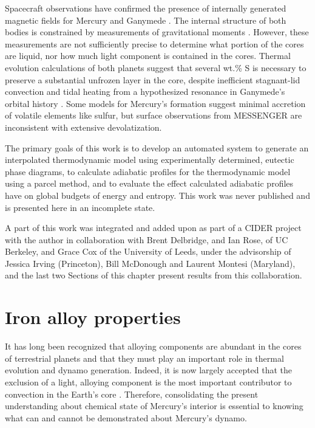 Spacecraft observations have confirmed the presence of internally generated
magnetic fields for Mercury \citep{Anderson2011} and Ganymede \cite{Kivelson1996}.
The internal structure of both bodies is constrained by measurements of
gravitational moments \citep{Smith2012,Hauck2006}. However, these measurements are
not sufficiently precise to determine what portion of the cores are liquid, nor
how much light component is contained in the cores. Thermal evolution
calculations of both planets \citep{Hauck2004,Hauck2006,Breuer2007,Bland2008} suggest
that several wt.\% S is necessary to preserve a substantial unfrozen layer in
the core, despite inefficient stagnant-lid convection
\citep{Solomatov2000,Hauck2004,Breuer2007} and tidal heating from a hypothesized
resonance in Ganymede's orbital history \citep{Showman1997,Bland2008}. Some models
for Mercury's formation suggest minimal accretion of volatile elements like
sulfur, but surface observations from MESSENGER \citep{Nittler2011,Mccubbin2012} are
inconsistent with extensive devolatization.

The primary goals of this work is to develop an automated system to generate an
interpolated thermodynamic model using experimentally determined, eutectic
phase diagrams, to calculate adiabatic profiles for the thermodynamic model
using a parcel method, and to evaluate the effect calculated adiabatic profiles
have on global budgets of energy and entropy. This work was never published and
is presented here in an incomplete state.

A part of this work was integrated and added upon as part of a CIDER project with the
author in collaboration with Brent Delbridge, and Ian Rose, of UC Berkeley, and Grace
Cox of the University of Leeds, under the advisorship of Jessica Irving (Princeton),
Bill McDonough and Laurent Montesi (Maryland), and  the last two Sections of this
chapter present results from this collaboration.

\section{Iron alloy properties}

It has long been recognized that alloying components are abundant in the cores
of terrestrial planets and that they must play an important role in thermal
evolution and dynamo generation. Indeed, it is now largely accepted that the
exclusion of a light, alloying component is the most important contributor to
convection in the Earth's core \citep{Lister1995}. Therefore,
consolidating the present understanding about chemical state of Mercury's
interior is essential to knowing what can and cannot be demonstrated about
Mercury's dynamo.

